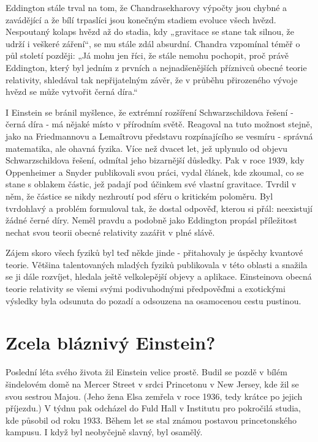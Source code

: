   Eddington stále trval na tom, že Chandrasekharovy výpočty jsou chybné a zavádějící a že bílí
  trpaslíci jsou konečným stadiem evoluce všech hvězd. Nespoutaný kolaps hvězd až do stadia, kdy
  „gravitace se stane tak silnou, že udrží i veškeré záření“, se mu stále zdál absurdní. Chandra
  vzpomínal téměř o půl století později: „Já mohu jen říci, že stále nemohu pochopit, proč právě
  Eddington, který byl jedním z prvních a nejnadšenějších příznivců obecné teorie relativity,
  shledával tak nepřijatelným závěr, že v průběhu přirozeného vývoje hvězd se může vytvořit černá
  díra.“
  
  I Einstein se bránil myšlence, že extrémní rozšíření Schwarzschildova řešení - černá díra - má
  nějaké místo v přírodním světě. Reagoval na tuto možnost stejně, jako na Friedmannovu a Lemaîtrovu
  představu rozpínajícího se vesmíru - správná matematika, ale ohavná fyzika. Více než dvacet let,
  jež uplynulo od objevu Schwarzschildova řešení, odmítal jeho bizarnější důsledky. Pak v roce 1939,
  kdy Oppenheimer a Snyder publikovali svou práci, vydal článek, kde zkoumal, co se stane s oblakem
  částic, jež padají pod účinkem své vlastní gravitace. Tvrdil v něm, že částice se nikdy nezhroutí
  pod sféru o kritickém poloměru. Byl tvrdohlavý a problém formuloval tak, že dostal odpověď, kterou
  si přál: neexistují žádné černé díry. Neměl pravdu a podobně jako Eddington propásl příležitost
  nechat svou teorii obecné relativity zazářit v plné slávě. 
  
  Zájem skoro všech fyziků byl teď někde jinde - přitahovaly je úspěchy kvantové teorie. Většina
  talentovaných mladých fyziků publikovala v této oblasti a snažila se ji dále rozvíjet, hledala
  ještě velkolepější objevy a aplikace. Einsteinova obecná teorie relativity se všemi svými
  podivuhodnými předpověďmi a exotickými výsledky byla odsunuta do pozadí a odsouzena na osamocenou
  cestu pustinou.

\section{Zcela bláznivý Einstein?}\label{feyIchIIIsecVI}
  Poslední léta svého života žil Einstein velice prostě. Budil se pozdě v bílém šindelovém domě na
  Mercer Street v srdci Princetonu v New Jersey, kde žil se svou sestrou Majou. (Jeho žena Elsa
  zemřela v roce 1936, tedy krátce po jejich příjezdu.) V týdnu pak odcházel do Fuld Hall v
  Institutu pro pokročilá studia, kde působil od roku 1933. Během let se stal známou postavou
  princetonského kampusu. I když byl neobyčejně slavný, byl osamělý. 
  

